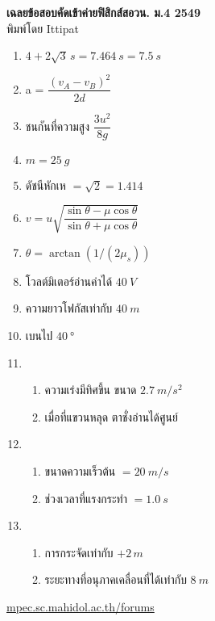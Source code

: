 \documentclass[a4paper,12pt]{article}
\begin{document}
\thispagestyle{empty}
\begin{center}
	{\huge \textbf{เฉลยข้อสอบคัดเข้าค่ายฟิสิกส์สอวน. ม.\textenglish{4} 2549}}\\
	พิมพ์โดย Ittipat\\
\end{center}
\begin{enumerate}
	\item \(4 + 2\sqrt{3}\,\si{s} = \SI{7.464}{s} = \SI{7.5}{s}\)
	\item  a = \(\dfrac{\left(v_A - v_B\right)^2}{2d}\)
	\item ชนกันที่ความสูง \(\dfrac{3u^2}{8g}\)
	\item \(m = \SI{25}{g}\)
	\item ดัชนีหักเห \(= \sqrt 2 = 1.414\)
	\item \(v = u \sqrt{\dfrac{\sin \theta - \mu \cos \theta}{\sin \theta + \mu \cos \theta}}\)
	\item \( \theta = \arctan \left (1/(2\mu_s)\right )\)
	\item โวลต์มิเตอร์อ่านค่าได้ \(\SI{40}{V}\)
	\item ความยาวโฟกัสเท่ากับ \(\SI{40}{m}\)
	\item เบนไป \(\SI{40}{\degree}\)
	\item \
	\begin{enumerate}
		\item ความเร่งมีทิศขึ้น ขนาด \(\SI{2.7}{m/s^2}\)
		\item เมื่อที่แขวนหลุด ตาชั่งอ่านได้ศูนย์
	\end{enumerate}
	\item \
	\begin{enumerate}
		\item ขนาดความเร็วต้น \(= \SI{20}{m/s}\)
		\item ช่วงเวลาที่แรงกระทำ \(= \SI{1.0}{s}\)
	\end{enumerate}
	\item \
	\begin{enumerate}
		\item การกระจัดเท่ากับ \(+2\,\si{m}\)
		\item ระยะทางที่อนุภาคเคลื่อนที่ได้เท่ากับ \(\SI{8}{m}\)
	\end{enumerate}
\end{enumerate}
\vfill	
\begin{center}
	\href{http://mpec.sc.mahidol.ac.th/forums/}{mpec.sc.mahidol.ac.th/forums}
\end{center}
\end{document}
